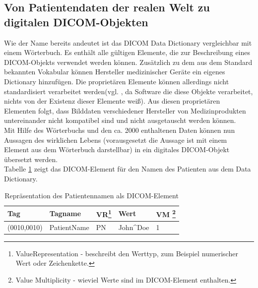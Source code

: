 \FloatBarrier
\subsection{Von Patientendaten der realen Welt zu digitalen DICOM-Objekten} \label{grundlagen:dicomObjects}
Wie der Name bereits andeutet ist das DICOM Data Dictionary vergleichbar mit einem Wörterbuch. Es enthält alle gültigen Elemente, die zur Beschreibung eines DICOM-Objekts verwendet werden können. Zusätzlich zu dem aus dem Standard bekannten Vokabular können Hersteller medizinischer Geräte ein eigenes Dictionary hinzufügen. Die proprietären Elemente können allerdings nicht standardisiert verarbeitet werden(vgl. \cite[S.45]{pianykh:dicom}, da Software die diese Objekte verarbeitet, nichts von der Existenz dieser Elemente weiß). Aus diesen proprietären Elementen folgt, dass Bilddaten verschiedener Hersteller von Medizinprodukten untereinander nicht kompatibel sind und nicht ausgetauscht werden können.\\
Mit Hilfe des Wörterbuchs und den ca. 2000 enthaltenen Daten können nun Aussagen des wirklichen Lebens (vorausgesetzt die Aussage ist mit einem Element aus dem Wörterbuch darstellbar) in ein digitales DICOM-Objekt übersetzt werden.\\
Tabelle \ref{table:patientname} zeigt das DICOM-Element für den Namen des Patienten aus dem Data Dictionary\cite[S. 14]{dicom:dd}.

\begin{table}
    \begin{tabularx}{\textwidth}{|X|X|X|X|X|}
    \toprule
    \hline
    \textbf{Tag}         & \textbf{Tagname}     & \textbf{VR\footnote{ValueRepresentation - beschreibt den Werttyp, zum Beispiel numerischer Wert oder Zeichenkette.}} & \textbf{Wert}     	& \textbf{VM \footnote{Value Multiplicity - wieviel Werte sind im DICOM-Element enthalten.}} \\ \hline
    (0010,0010) 		 & PatientName 			& PN 		  & John\^{}Doe 		& 1  \\  \hline
    \bottomrule
    \end{tabularx}
    \caption {Repräsentation des Patientennamen als DICOM-Element}
    \label{table:patientname}
\end{table}

